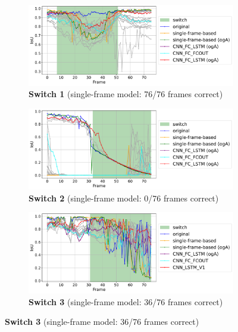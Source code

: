 \begin{figure}[H]
    \centering
    \begin{subfigure}[t]{0.8\textwidth}
        \centering
        \includegraphics[width=\textwidth]{PICs/experiments/temporalModels/plot_ious_sequence_4_updated_v2.pdf}
        \caption{\textbf{Switch 1} (single-frame model: 76/76 frames correct)}
        \label{fig:IoUTrends_switch_4}
    \end{subfigure}


    \begin{subfigure}[t]{0.8\textwidth}
        \centering
        \includegraphics[width=\textwidth]{PICs/experiments/temporalModels/plot_ious_sequence_2_updated_v2.pdf}
        \caption{\textbf{Switch 2} (single-frame model: 0/76 frames correct)}
        \label{fig:IoUTrends_switch_2}
    \end{subfigure}


    \begin{subfigure}[t]{0.8\textwidth}
        \centering
        \includegraphics[width=\textwidth]{PICs/experiments/temporalModels/plot_ious_sequence_3_updated_v2.pdf}
        \caption{\textbf{Switch 3} (single-frame model: 36/76 frames correct)}
        \label{fig:IoUTrends_switch_3}
    \end{subfigure}


\end{figure}

